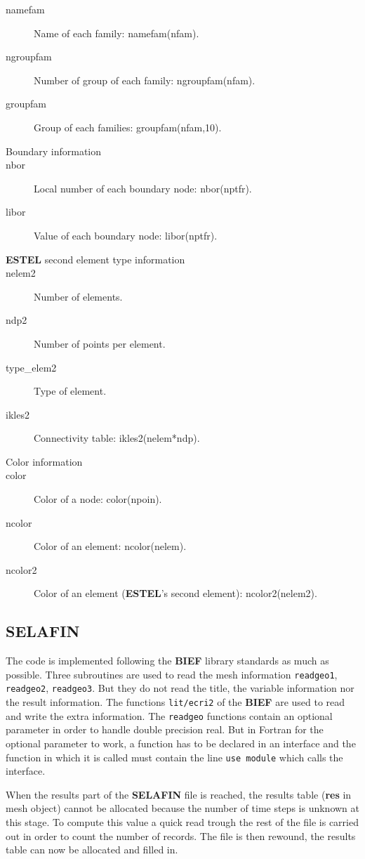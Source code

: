 \documentclass[a4paper,10pt]{article}
\newcommand{\bief}{\textbf{BIEF}\xspace}
\newcommand{\estel}{\textbf{ESTEL}\xspace}
\newcommand{\slf}{\textbf{SELAFIN}\xspace}
\begin{document}
\begin{description}
\item[namefam] Name of each family: namefam(nfam).
\item[ngroupfam] Number of group of each family: ngroupfam(nfam).
\item[groupfam] Group of each families: groupfam(nfam,10).
\item[Boundary information]
\item[nbor] Local number of each boundary node: nbor(nptfr).
\item[libor] Value of each boundary node: libor(nptfr).
\item[\estel second element type information]
\item[nelem2] Number of elements.
\item[ndp2] Number of points per element.
\item[type\_elem2] Type of element.
\item[ikles2] Connectivity table: ikles2(nelem*ndp).
\item[Color information]
\item[color] Color of a node: color(npoin).
\item[ncolor] Color of an element: ncolor(nelem).
\item[ncolor2] Color of an element (\estel's second element): ncolor2(nelem2).
\end{description}


\subsection{\slf}

The code is implemented following the \bief library standards as much as
possible. Three subroutines are used to read the mesh information
\verb+readgeo1+, \verb+readgeo2+, \verb+readgeo3+. But they do not read the
title, the variable information nor the result information. The functions
\verb+lit/ecri2+ of the \bief are used to read and write the extra information.
The \verb+readgeo+ functions contain an optional parameter in order to handle
double precision real.  But in Fortran for the optional parameter to work, a
function has to be declared in an interface and the function in which it is
called must contain the line \verb+use module+ which calls the interface.

When the results part of the \slf file is reached, the results table
(\textbf{res} in mesh object) cannot be allocated because the number of time
steps is unknown at this stage.  To compute this value a quick read trough the
rest of the file is carried out in order to count the number of records.  The
file is then rewound, the results table can now be allocated and filled in.
\end{document}
